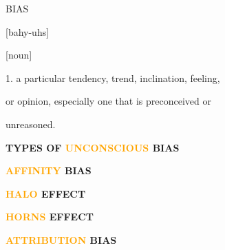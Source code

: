 \documentclass{beamer}
\begin{document}
\begin{frame}
    \begin{center}
    \begin{minipage}{.5\textwidth}
        \LARGE{BIAS}
    \end{minipage}
    \begin{minipage}{.3\textwidth}
        \normalsize{[bahy-uhs]}
    \end{minipage}
    \vspace{.5cm}

    \hspace{-8cm} \normalsize{[noun]}\\
    \end{center}
    \hspace{.8cm} \normalsize{1. a particular tendency, trend, inclination, feeling,}

    \hspace{1cm} \normalsize{or opinion, especially one that is preconceived or}

    \hspace{1cm} \normalsize{unreasoned.}
\end{frame}

\begin{frame}
    \begin{center}
        \textbf{\Large{TYPES OF \textcolor{orange}{UNCONSCIOUS} BIAS}}
    \end{center}
\end{frame}

\begin{frame}
    \begin{center}
        \textbf{\Large{\textcolor{orange}{AFFINITY} BIAS}}
    \end{center}
\end{frame}

\begin{frame}
    \begin{center}
        \textbf{\Large{\textcolor{orange}{HALO} EFFECT}}
    \end{center}
\end{frame}

\begin{frame}
    \begin{center}
        \textbf{\Large{\textcolor{orange}{HORNS} EFFECT}}
    \end{center}
\end{frame}

\begin{frame}
    \begin{center}
        \textbf{\Large{\textcolor{orange}{ATTRIBUTION} BIAS}}
    \end{center}
\end{frame}
\end{document}
